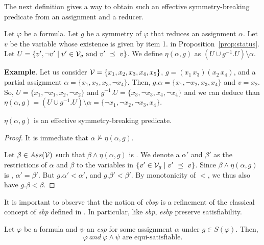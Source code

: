 The next definition gives a way to obtain such an effective symmetry-breaking predicate from an assignment and a reducer.

\begin{definition}
	\label{def:eta}
	Let $\varphi$ be a formula.
	Let $g$ be a symmetry of $\varphi$ that reduces an assignment $\alpha$.
	Let $v$ be the variable whose existence is given by item 1. in Proposition~\ref{prop:status}.
	Let $U = \{ v', \neg v' \mid v' \in \mathcal{V}_g \text{ and } v'~\preceq~v\}$.
	We define $\eta(\alpha, g)$ as $(U \cup g^{-1}.U) \setminus \alpha$.
\end{definition}

\textbf{Example}. Let us consider $\mathcal{V} = \{x_1, x_2, x_3, x_4, x_5\}$, $g =
(x_1\,x_3)(x_2\,x_4)$, and a partial assignment $\alpha = \{x_1, x_2,
x_3, \neg x_4\}$. Then, $g.\alpha = \{x_1, \neg x_2, x_3, x_4\}$ and $v = x_2$.
So, $U = \{x_1, \neg x_1, x_2, \neg x_2\}$ and $g^{-1}.U = \{x_3, \neg x_3,
x_4, \neg x_4\}$ and we can deduce than $\eta(\alpha, g) = (U \cup g^{-1}.U)
\setminus \alpha = \{\neg x_1, \neg x_2, \neg x_3, x_4\}$.

\begin{proposition}
	\label{prop:eta}
	$\eta(\alpha, g)$ is an effective symmetry-breaking predicate.
\end{proposition}
\begin{proof}
	It is immediate that $\alpha \not\models \eta(\alpha, g)$.
	
	Let $\beta \in Ass(\mathcal{V})$ such that $\beta \wedge \eta(\alpha, g)$ is \unsat. We denote a $\alpha'$
	and $\beta'$ as the restrictions of $\alpha$ and $\beta$ to the variables in $\{ v' \in
	\mathcal{V}_g \mid v'~\preceq~v \}$. Since $\beta \wedge \eta(\alpha, g)$ is \unsat, $\alpha' = \beta'$.
	But $g.\alpha' < \alpha'$, and $g.\beta' < \beta'$. By monotonicity of $<$, we thus also have
	$g.\beta < \beta$. \end{proof}

\medskip\noindent It is important to observe that the notion of \textit{ebsp}
is a refinement of the classical concept of \textit{sbp} defined in
\cite{aloul06}. In particular, like \textit{sbp}, \textit{esbp} preserve
satisfiability.

\begin{theorem}
	Let $\varphi$ be a formula and $\psi$ an \textit{esp} for some assignment $\alpha$ under $g \in S(\varphi)$. Then,
	$$\varphi~and ~\varphi \wedge \psi \text{ are equi-satisfiable}.$$
\end{theorem}

